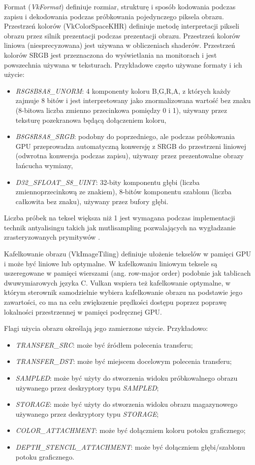 Format (\textit{VkFormat}) definiuje rozmiar, strukturę i sposób kodowania podczas zapisu i dekodowania podczas próbkowania pojedynczego piksela obrazu.
Przestrzeń kolorów (VkColorSpaceKHR) definiuje metodę interpretacji pikseli obrazu przez silnik prezentacji podczas prezentacji obrazu.
Przestrzeń kolorów liniowa (niesprecyzowana) jest używana w obliczeniach shaderów.
Przestrzeń kolorów SRGB jest przeznaczona do wyświetlania na monitorach i jest powszechnia używana w teksturach.
Przykładowe często używane formaty i ich użycie:
\begin{itemize}
	\item \textit{R8G8B8A8\_UNORM}: 4 komponenty koloru B,G,R,A, z których każdy zajmuje 8 bitów i jest interpretowany jako znormalizowana wartość bez znaku (8-bitowa liczba zmienno przecinkowa pomiędzy 0 i 1), używany przez teksturę pozekranowa będącą dołączeniem koloru,
	\item \textit{B8G8R8A8\_SRGB}: podobny do poprzedniego, ale podczas próbkowania GPU przeprowadza automatyczną konwersję z SRGB do przestrzeni liniowej (odwrotna konwersja podczas zapisu), używany przez prezentowalne obrazy łańcucha wymiany,
	\item \textit{D32\_SFLOAT\_S8\_UINT}: 32-bity komponentu głębi (liczba zmiennoprzecinkową ze znakiem), 8-bitów komponentu szablonu (liczba całkowita bez znaku), używany przez bufory głębi.
\end{itemize}

Liczba próbek na teksel większa niż 1 jest wymagana podczas implementacji technik antyalisingu takich jak mutlisampling pozwalających na wygładzanie zrasteryzowanych prymitywów \cite{HughesDamEtAl13}.

Kafelkowanie obrazu (VkImageTiling) definiuje ułożenie tekselów w pamięci GPU i może być liniowe lub optymalne.
W kafelkowaniu liniowym teksele są uszeregowane w pamięci wierszami (ang. row-major order) podobnie jak tablicach dwuwymiarowych języka C.
Vulkan wspiera też kafelkowanie optymalne, w którym sterownik samodzielnie wybiera kafelkowanie obrazu na podstawie jego zawartości, co ma na celu zwiększenie prędkości dostępu poprzez poprawę lokalności przestrzennej w pamięci podręcznej GPU.

Flagi użycia obrazu określają jego zamierzone użycie.
Przykładowo:
\begin{itemize}
	\item \textit{TRANSFER\_SRC}: może być źródłem polecenia transferu;
	\item \textit{TRANSFER\_DST}: może być miejscem docelowym polecenia transferu;
	\item \textit{SAMPLED}: może być użyty do stworzenia widoku próbkowalnego obrazu używanego przez deskryptory typu \textit{SAMPLED};
	\item \textit{STORAGE}: może być użyty do stworzenia widoku obrazu magazynowego używanego przez deskryptory typu \textit{STORAGE};
	\item \textit{COLOR\_ATTACHMENT}: może być dołączniem koloru potoku graficznego;
	\item \textit{DEPTH\_STENCIL\_ATTACHMENT}: może być dołączniem głębi/szablonu potoku graficznego.
\end{itemize}

